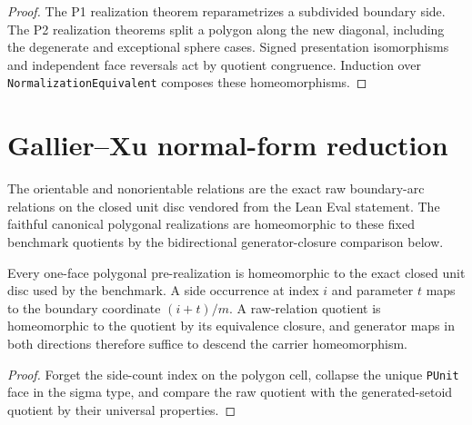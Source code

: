\begin{proof}
\leanok
The P1 realization theorem reparametrizes a subdivided boundary side.  The P2
realization theorems split a polygon along the new diagonal, including the
degenerate and exceptional sphere cases.  Signed presentation isomorphisms and
independent face reversals act by quotient congruence.  Induction over
\texttt{NormalizationEquivalent} composes these homeomorphisms.
\end{proof}

\section{Gallier--Xu normal-form reduction}

\begin{definition}
\label{moise:def:eval_quotient_representatives}
\leanok
The orientable and nonorientable relations are the exact raw boundary-arc
relations on the closed unit disc vendored from the Lean Eval statement. The
faithful canonical polygonal realizations are homeomorphic to these fixed
benchmark quotients by the bidirectional generator-closure comparison below.
\end{definition}

\begin{lemma}
\label{moise:lem:representative_carrier_bridge}
\leanok
{}
Every one-face polygonal pre-realization is homeomorphic to the exact closed
unit disc used by the benchmark. A side occurrence at index $i$ and parameter
$t$ maps to the boundary coordinate $(i+t)/m$. A raw-relation quotient is
homeomorphic to the quotient by its equivalence closure, and generator maps in
both directions therefore suffice to descend the carrier homeomorphism.
\end{lemma}

\begin{proof}
\leanok
Forget the side-count index on the polygon cell, collapse the unique
\texttt{PUnit} face in the sigma type, and compare the raw quotient with the
generated-setoid quotient by their universal properties.
\end{proof}

